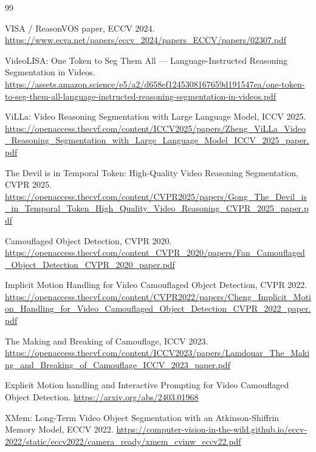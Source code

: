 \documentclass[11pt]{article}
\begin{document}
\begin{thebibliography}{99}

VISA / ReasonVOS paper, ECCV 2024.\newline
\url{https://www.ecva.net/papers/eccv_2024/papers_ECCV/papers/02307.pdf}

VideoLISA: One Token to Seg Them All --- Language-Instructed Reasoning Segmentation in Videos.\newline
\url{https://assets.amazon.science/e5/a2/d658ef1245308167659d191547ea/one-token-to-seg-them-all-language-instructed-reasoning-segmentation-in-videos.pdf}

ViLLa: Video Reasoning Segmentation with Large Language Model, ICCV 2025.\newline
\url{https://openaccess.thecvf.com/content/ICCV2025/papers/Zheng_ViLLa_Video_Reasoning_Segmentation_with_Large_Language_Model_ICCV_2025_paper.pdf}

The Devil is in Temporal Token: High-Quality Video Reasoning Segmentation, CVPR 2025.\newline
\url{https://openaccess.thecvf.com/content/CVPR2025/papers/Gong_The_Devil_is_in_Temporal_Token_High_Quality_Video_Reasoning_CVPR_2025_paper.pdf}

Camouflaged Object Detection, CVPR 2020.\newline
\url{https://openaccess.thecvf.com/content_CVPR_2020/papers/Fan_Camouflaged_Object_Detection_CVPR_2020_paper.pdf}

Implicit Motion Handling for Video Camouflaged Object Detection, CVPR 2022.\newline
\url{https://openaccess.thecvf.com/content/CVPR2022/papers/Cheng_Implicit_Motion_Handling_for_Video_Camouflaged_Object_Detection_CVPR_2022_paper.pdf}

The Making and Breaking of Camouflage, ICCV 2023.\newline
\url{https://openaccess.thecvf.com/content/ICCV2023/papers/Lamdouar_The_Making_and_Breaking_of_Camouflage_ICCV_2023_paper.pdf}

Explicit Motion handling and Interactive Prompting for Video Camouflaged Object Detection.\newline
\url{https://arxiv.org/abs/2403.01968}

XMem: Long-Term Video Object Segmentation with an Atkinson-Shiffrin Memory Model, ECCV 2022.\newline
\url{https://computer-vision-in-the-wild.github.io/eccv-2022/static/eccv2022/camera_ready/xmem_cvinw_eccv22.pdf}


\end{thebibliography}
\end{document}
